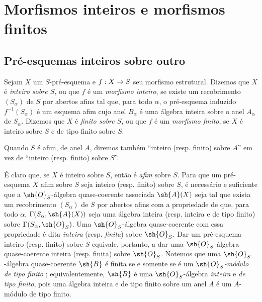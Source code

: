 \documentclass[oneside,10pt]{amsart}
\makeatletter
\newcommand{\ega@arrow}[2]{\mathchoice{#1}{#2}{#2}{#2}}
\renewcommand{\to}{\ega@arrow{\longrightarrow}{\rightarrow}}
\let\EGAOriginalLabel\label
\renewcommand{\label}[1]{\phantomsection\EGAOriginalLabel{#1}}
\makeatother
\begin{document}
\section{Morfismos inteiros e morfismos finitos}
\label{section:II.6}

\subsection{Pré-esquemas inteiros sobre outro}
\label{subsection:II.6.1}

\begin{definition}[6.1.1]
\label{II.6.1.1}
Sejam $X$ um $S$-pré-esquema e $f:X\to S$ seu morfismo estrutural.
Dizemos que $X$ é \emph{inteiro sobre $S$}, ou que $f$ é um \emph{morfismo inteiro}, se existe um recobrimento $(S_\alpha)$ de $S$ por abertos afins tal que, para todo $\alpha$, o pré-esquema induzido $f^{-1}(S_\alpha)$ é um esquema afim cujo anel $B_\alpha$ é uma álgebra inteira sobre o anel $A_\alpha$ de $S_\alpha$.
Dizemos que $X$ é \emph{finito sobre $S$}, ou que $f$ é um \emph{morfismo finito}, se $X$ é inteiro sobre $S$ e de tipo finito sobre $S$.
\end{definition}

Quando $S$ é afim, de anel $A$, diremos também ``inteiro (resp. finito) sobre $A$'' em vez de ``inteiro (resp. finito) sobre $S$''.

\begin{env}[6.1.2]
\label{II.6.1.2}
É claro que, se $X$ é inteiro sobre $S$, então é \emph{afim} sobre $S$.
Para que um pré-esquema $X$ afim sobre $S$ seja inteiro (resp. finito) sobre $S$, é necessário e suficiente que a $\sh{O}_S$-álgebra quase-coerente associada $\sh{A}(X)$ seja tal que exista um recobrimento $(S_\alpha)$ de $S$ por abertos afins com a propriedade de que, para todo $\alpha$, $\Gamma(S_\alpha,\sh{A}(X))$ seja uma álgebra inteira (resp. inteira e de tipo finito) sobre $\Gamma(S_\alpha,\sh{O}_S)$.
Uma $\sh{O}_S$-álgebra quase-coerente com essa propriedade é dita \emph{inteira} (resp. \emph{finita}) sobre $\sh{O}_S$.
Dar um pré-esquema inteiro (resp. finito) sobre $S$ equivale, portanto,  a dar uma $\sh{O}_S$-álgebra quase-coerente inteira (resp. finita) sobre $\sh{O}_S$.
Notemos que uma $\sh{O}_S$-álgebra quase-coerente $\sh{B}$ é finita se e somente se é um \emph{$\sh{O}_S$-módulo de tipo finito} ;
equivalentemente, $\sh{B}$ é uma $\sh{O}_S$-álgebra \emph{inteira} e \emph{de tipo finito}, pois uma álgebra inteira e de tipo finito sobre um anel $A$ é um $A$-módulo de tipo finito.
\end{env}
\end{document}
